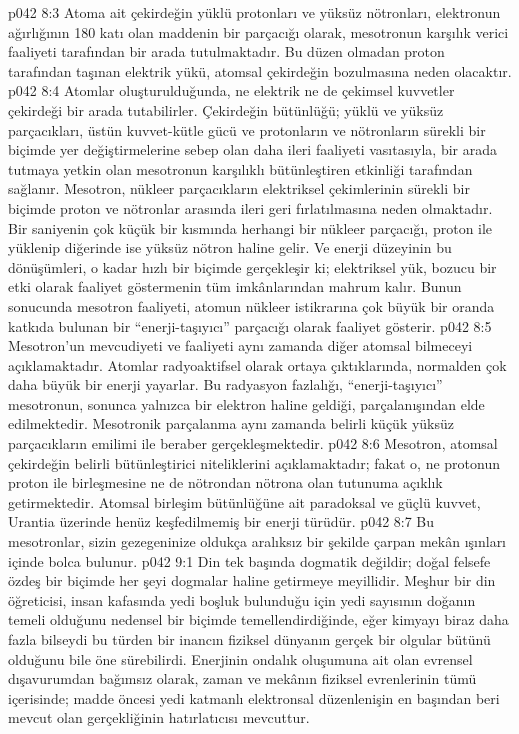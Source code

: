 \vs p042 8:3 Atoma ait çekirdeğin yüklü protonları ve yüksüz nötronları, elektronun ağırlığının 180 katı olan maddenin bir parçacığı olarak, mesotronun karşılık verici faaliyeti tarafından bir arada tutulmaktadır. Bu düzen olmadan proton tarafından taşınan elektrik yükü, atomsal çekirdeğin bozulmasına neden olacaktır.
\vs p042 8:4 Atomlar oluşturulduğunda, ne elektrik ne de çekimsel kuvvetler çekirdeği bir arada tutabilirler. Çekirdeğin bütünlüğü; yüklü ve yüksüz parçacıkları, üstün kuvvet\hyp{}kütle gücü ve protonların ve nötronların sürekli bir biçimde yer değiştirmelerine sebep olan daha ileri faaliyeti vasıtasıyla, bir arada tutmaya yetkin olan mesotronun karşılıklı bütünleştiren etkinliği tarafından sağlanır. Mesotron, nükleer parçacıkların elektriksel çekimlerinin sürekli bir biçimde proton ve nötronlar arasında ileri geri fırlatılmasına neden olmaktadır. Bir saniyenin çok küçük bir kısmında herhangi bir nükleer parçacığı, proton ile yüklenip diğerinde ise yüksüz nötron haline gelir. Ve enerji düzeyinin bu dönüşümleri, o kadar hızlı bir biçimde gerçekleşir ki; elektriksel yük, bozucu bir etki olarak faaliyet göstermenin tüm imkânlarından mahrum kalır. Bunun sonucunda mesotron faaliyeti, atomun nükleer istikrarına çok büyük bir oranda katkıda bulunan bir “enerji\hyp{}taşıyıcı” parçacığı olarak faaliyet gösterir.
\vs p042 8:5 Mesotron’un mevcudiyeti ve faaliyeti aynı zamanda diğer atomsal bilmeceyi açıklamaktadır. Atomlar radyoaktifsel olarak ortaya çıktıklarında, normalden çok daha büyük bir enerji yayarlar. Bu radyasyon fazlalığı, “enerji\hyp{}taşıyıcı” mesotronun, sonunca yalnızca bir elektron haline geldiği, parçalanışından elde edilmektedir. Mesotronik parçalanma aynı zamanda belirli küçük yüksüz parçacıkların emilimi ile beraber gerçekleşmektedir.
\vs p042 8:6 Mesotron, atomsal çekirdeğin belirli bütünleştirici niteliklerini açıklamaktadır; fakat o, ne protonun proton ile birleşmesine ne de nötrondan nötrona olan tutunuma açıklık getirmektedir. Atomsal birleşim bütünlüğüne ait paradoksal ve güçlü kuvvet, Urantia üzerinde henüz keşfedilmemiş bir enerji türüdür.
\vs p042 8:7 Bu mesotronlar, sizin gezegeninize oldukça aralıksız bir şekilde çarpan mekân ışınları içinde bolca bulunur.
\vs p042 9:1 Din tek başında dogmatik değildir; doğal felsefe özdeş bir biçimde her şeyi dogmalar haline getirmeye meyillidir. Meşhur bir din öğreticisi, insan kafasında yedi boşluk bulunduğu için yedi sayısının doğanın temeli olduğunu nedensel bir biçimde temellendirdiğinde, eğer kimyayı biraz daha fazla bilseydi bu türden bir inancın fiziksel dünyanın gerçek bir olgular bütünü olduğunu bile öne sürebilirdi. Enerjinin ondalık oluşumuna ait olan evrensel dışavurumdan bağımsız olarak, zaman ve mekânın fiziksel evrenlerinin tümü içerisinde; madde öncesi yedi katmanlı elektronsal düzenlenişin en başından beri mevcut olan gerçekliğinin hatırlatıcısı mevcuttur.
